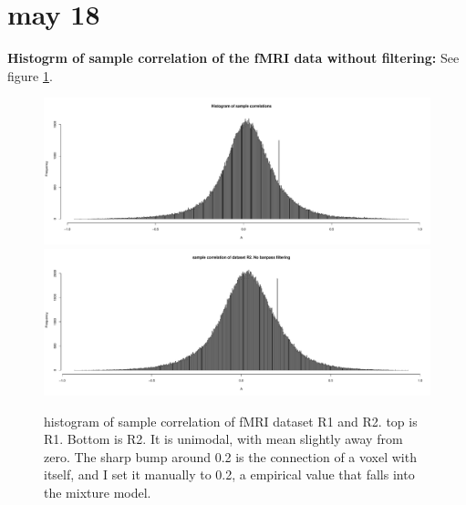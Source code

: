 \documentclass[12pt]{article}
\begin{document}
\section{may 18} 
\textbf{Histogrm of sample correlation of the fMRI data without filtering: } See figure \ref{fig101}. 
\begin{figure}[htb]
\includegraphics[width = 1\textwidth]{corr_hist}\\
\includegraphics[width = 1\textwidth]{figures2/corr_hist_nofilter_R2}
\caption{histogram of sample correlation of fMRI dataset R1 and R2. top is R1. Bottom is R2.  It is unimodal, with mean slightly away from zero. The sharp bump around 0.2 is the connection of a voxel with itself, and I set it manually to 0.2, a empirical value that falls into the mixture model.}
\label{fig101}
\end{figure}
\end{document}
